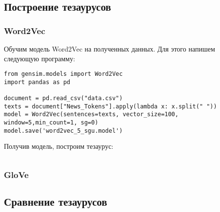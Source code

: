 \documentclass[coursework]{SCWorks}
\begin{document}
\subsection{Построение тезаурусов}
\subsubsection{Word2Vec}
Обучим модель Word2Vec на полученных данных. Для этого напишем следующую программу:
\begin{verbatim}
from gensim.models import Word2Vec
import pandas as pd

document = pd.read_csv("data.csv")
texts = document["News_Tokens"].apply(lambda x: x.split(" "))
model = Word2Vec(sentences=texts, vector_size=100, window=5,min_count=1, sg=0)
model.save('word2vec_5_sgu.model')
\end{verbatim}

Получив модель, построим тезаурус:
\begin{verbatim}

\end{verbatim}
\subsubsection{GloVe}
\subsection{Сравнение тезаурусов}

\conclusion


% 
% 

\appendix
\end{document}
